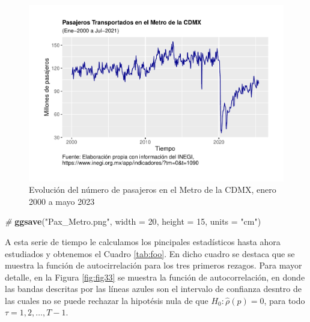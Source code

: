 \documentclass[
]{book}
\newenvironment{Shaded}{\begin{snugshade}}{\end{snugshade}}
\newcommand{\AttributeTok}[1]{\textcolor[rgb]{0.13,0.29,0.53}{#1}}
\newcommand{\CommentTok}[1]{\textcolor[rgb]{0.56,0.35,0.01}{\textit{#1}}}
\newcommand{\DecValTok}[1]{\textcolor[rgb]{0.00,0.00,0.81}{#1}}
\newcommand{\FunctionTok}[1]{\textcolor[rgb]{0.13,0.29,0.53}{\textbf{#1}}}
\newcommand{\NormalTok}[1]{#1}
\newcommand{\StringTok}[1]{\textcolor[rgb]{0.31,0.60,0.02}{#1}}
\begin{document}
\begin{figure}

{\centering \includegraphics{Notas-Series-Tiempo_files/figure-latex/fig32-1} 

}

\caption{Evolución del número de pasajeros en el Metro de la CDMX, enero 2000 a mayo 2023}\label{fig:fig32}
\end{figure}

\begin{Shaded}
\begin{Highlighting}[]
\CommentTok{\#}
\FunctionTok{ggsave}\NormalTok{(}\StringTok{"Pax\_Metro.png"}\NormalTok{, }\AttributeTok{width =} \DecValTok{20}\NormalTok{, }\AttributeTok{height =} \DecValTok{15}\NormalTok{, }\AttributeTok{units =} \StringTok{"cm"}\NormalTok{)}
\end{Highlighting}
\end{Shaded}

A esta serie de tiempo le calculamos los pincipales estadísticos hasta ahora estudiados y obtenemos el Cuadro \ref{tab:foo}. En dicho cuadro se destaca que se muestra la función de autocirrelación para los tres primeros rezagos. Para mayor detalle, en la Figura \ref{fig:fig33} se muestra la función de autocorrelación, en donde las bandas descritas por las líneas azules son el intervalo de confianza desntro de las cuales no se puede rechazar la hipotésis nula de que \(H_0: \hat{\rho}(p) = 0\), para todo \(\tau = 1, 2, \ldots, T-1\).
\end{document}
